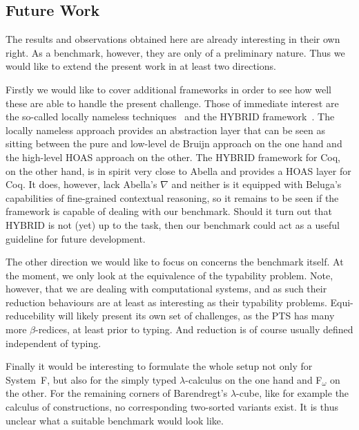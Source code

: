 \documentclass[a4paper,UKenglish]{lipics-v2016}
\begin{document}
\subsection{Future Work}
\label{sec:future-work}

The results and observations obtained here are already interesting in their own right.
As a benchmark, however, they are only of a preliminary nature.
Thus we would like to extend the present work in at least two directions.

Firstly we would like to cover additional frameworks in order to see how well these are able to handle the present challenge.
Those of immediate interest are the so-called locally nameless techniques~\cite{DBLP:conf/popl/AydemirCPPW08} and the HYBRID framework~\cite{Capretta2007, Capretta2009, DBLP:journals/jar/FeltyM12}.
The locally nameless approach provides an abstraction layer that can be seen as sitting between the pure and low-level de Bruijn approach on the one hand and the high-level HOAS approach on the other.
The HYBRID framework for Coq, on the other hand, is in spirit very close to Abella and provides a HOAS layer for Coq.
It does, however, lack Abella's $\nabla$ and neither is it equipped with Beluga's capabilities of fine-grained contextual reasoning, so it remains to be seen if the framework is capable of dealing with our benchmark.
Should it turn out that HYBRID is not (yet) up to the task, then our benchmark could act as a useful guideline for future development.

The other direction we would like to focus on concerns the benchmark itself.
At the moment, we only look at the equivalence of the typability problem.
Note, however, that we are dealing with computational systems, and as such their reduction behaviours are at least as interesting as their typability problems.
Equi-reducebility will likely present its own set of challenges, as the PTS has many more $\beta$-redices, at least prior to typing.
And reduction is of course usually defined independent of typing.

Finally it would be interesting to formulate the whole setup not only for System~F, but also for the simply typed $\lambda$-calculus on the one hand and F$_\omega$ on the other.
For the remaining corners of Barendregt's $\lambda$-cube, like for example the calculus of constructions, no corresponding two-sorted variants exist.
It is thus unclear what a suitable benchmark would look like.









 
\end{document}
